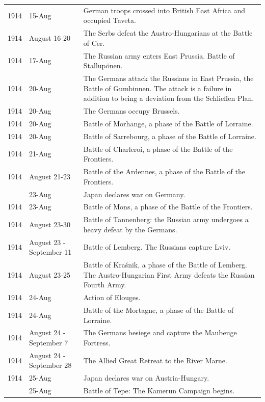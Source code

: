 \documentclass[
  openany]{book}
\begin{document}
\begin{longtable}[t]{rl>{\raggedright\arraybackslash}p{22em}}
\rowcolor{gray!6}  1914 & 15-Aug & German troops crossed into British East Africa and occupied Taveta.\\
1914 & August 16-20 & The Serbs defeat the Austro-Hungarians at the Battle of Cer.\\
\rowcolor{gray!6}  1914 & 17-Aug & The Russian army enters East Prussia. Battle of Stallupönen.\\
1914 & 20-Aug & The Germans attack the Russians in East Prussia, the Battle of Gumbinnen.  The attack is a failure in addition to being a deviation from the Schlieffen Plan.\\
\addlinespace
\rowcolor{gray!6}  1914 & 20-Aug & The Germans occupy Brussels.\\
1914 & 20-Aug & Battle of Morhange, a phase of the Battle of Lorraine.\\
\rowcolor{gray!6}  1914 & 20-Aug & Battle of Sarrebourg, a phase of the Battle of Lorraine.\\
1914 & 21-Aug & Battle of Charleroi, a phase of the Battle of the Frontiers.\\
\rowcolor{gray!6}  1914 & August 21-23 & Battle of the Ardennes, a phase of the Battle of the Frontiers.\\
\addlinespace
1914 & 23-Aug & Japan declares war on Germany.\\
\rowcolor{gray!6}  1914 & 23-Aug & Battle of Mons, a phase of the Battle of the Frontiers.\\
1914 & August 23-30 & Battle of Tannenberg: the Russian army undergoes a heavy defeat by the Germans.\\
\rowcolor{gray!6}  1914 & August 23 - September 11 & Battle of Lemberg. The Russians capture Lviv.\\
1914 & August 23-25 & Battle of Kraśnik, a phase of the Battle of Lemberg. The Austro-Hungarian First Army defeats the Russian Fourth Army.\\
\addlinespace
\rowcolor{gray!6}  1914 & 24-Aug & Action of Elouges.\\
1914 & 24-Aug & Battle of the Mortagne, a phase of the Battle of Lorraine.\\
\rowcolor{gray!6}  1914 & August 24 - September 7 & The Germans besiege and capture the Maubeuge Fortress.\\
1914 & August 24 - September 28 & The Allied Great Retreat to the River Marne.\\
\rowcolor{gray!6}  1914 & 25-Aug & Japan declares war on Austria-Hungary.\\
\addlinespace
1914 & 25-Aug & Battle of Tepe: The Kamerun Campaign begins.\\

\end{longtable}
\end{document}
